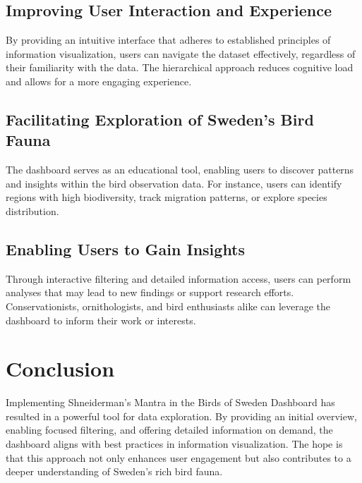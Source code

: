 \subsection{Improving User Interaction and Experience}

By providing an intuitive interface that adheres to established principles of information visualization, users can navigate the dataset effectively, regardless of their familiarity with the data. The hierarchical approach reduces cognitive load and allows for a more engaging experience.

\subsection{Facilitating Exploration of Sweden's Bird Fauna}

The dashboard serves as an educational tool, enabling users to discover patterns and insights within the bird observation data. For instance, users can identify regions with high biodiversity, track migration patterns, or explore species distribution.

\subsection{Enabling Users to Gain Insights}

Through interactive filtering and detailed information access, users can perform analyses that may lead to new findings or support research efforts. Conservationists, ornithologists, and bird enthusiasts alike can leverage the dashboard to inform their work or interests.

\section{Conclusion}

Implementing Shneiderman's Mantra in the Birds of Sweden Dashboard has resulted in a powerful tool for data exploration. By providing an initial overview, enabling focused filtering, and offering detailed information on demand, the dashboard aligns with best practices in information visualization. The hope is that this approach not only enhances user engagement but also contributes to a deeper understanding of Sweden's rich bird fauna.